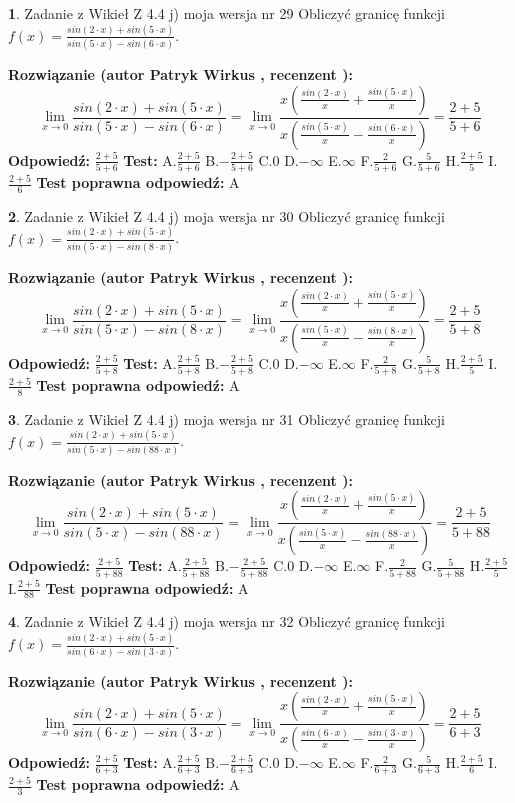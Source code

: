 \documentclass[12pt, a4paper]{article}
\theoremstyle{definition} %
\newtheorem{zad}{}
\newcommand{\zadStart}[1]{\begin{zad}#1\newline}
\newcommand{\zadStop}{\end{zad}}
\newcommand{\rozwStart}[2]{\noindent \textbf{Rozwiązanie (autor #1 , recenzent #2): }\newline}
\newcommand{\rozwStop}{\newline}
\newcommand{\odpStart}{\noindent \textbf{Odpowiedź:}\newline}
\newcommand{\odpStop}{\newline}
\newcommand{\testStart}{\noindent \textbf{Test:}\newline}
\newcommand{\testStop}{\newline}
\newcommand{\kluczStart}{\noindent \textbf{Test poprawna odpowiedź:}\newline}
\newcommand{\kluczStop}{\newline}
\begin{document}
\zadStart{Zadanie z Wikieł Z 4.4 j) moja wersja nr 29}
Obliczyć granicę funkcji $f(x)=\frac{sin(2\cdot x) +sin(5\cdot x)}{sin(5\cdot x) -sin(6\cdot x)}$.
\zadStop
\rozwStart{Patryk Wirkus}{}
$$\lim\limits_{x\to 0}\frac{sin(2\cdot x) +sin(5\cdot x)}{sin(5\cdot x) -sin(6\cdot x)}=\lim\limits_{x\to 0}\frac{x(\frac{sin(2\cdot x)}{x}+\frac{sin(5\cdot x)}{x})}{x(\frac{sin(5\cdot x)}{x}-\frac{sin(6\cdot x)}{x})}=\frac{2+5}{5+6}$$
\rozwStop
\odpStart
$\frac{2+5}{5+6}$
\odpStop
\testStart
A.$\frac{2+5}{5+6}$
B.$-\frac{2+5}{5+6}$
C.$0$
D.$-\infty$
E.$\infty$
F.$\frac{2}{5+6}$
G.$\frac{5}{5+6}$
H.$\frac{2+5}{5}$
I.$\frac{2+5}{6}$
\testStop
\kluczStart
A
\kluczStop



\zadStart{Zadanie z Wikieł Z 4.4 j) moja wersja nr 30}
Obliczyć granicę funkcji $f(x)=\frac{sin(2\cdot x) +sin(5\cdot x)}{sin(5\cdot x) -sin(8\cdot x)}$.
\zadStop
\rozwStart{Patryk Wirkus}{}
$$\lim\limits_{x\to 0}\frac{sin(2\cdot x) +sin(5\cdot x)}{sin(5\cdot x) -sin(8\cdot x)}=\lim\limits_{x\to 0}\frac{x(\frac{sin(2\cdot x)}{x}+\frac{sin(5\cdot x)}{x})}{x(\frac{sin(5\cdot x)}{x}-\frac{sin(8\cdot x)}{x})}=\frac{2+5}{5+8}$$
\rozwStop
\odpStart
$\frac{2+5}{5+8}$
\odpStop
\testStart
A.$\frac{2+5}{5+8}$
B.$-\frac{2+5}{5+8}$
C.$0$
D.$-\infty$
E.$\infty$
F.$\frac{2}{5+8}$
G.$\frac{5}{5+8}$
H.$\frac{2+5}{5}$
I.$\frac{2+5}{8}$
\testStop
\kluczStart
A
\kluczStop



\zadStart{Zadanie z Wikieł Z 4.4 j) moja wersja nr 31}
Obliczyć granicę funkcji $f(x)=\frac{sin(2\cdot x) +sin(5\cdot x)}{sin(5\cdot x) -sin(88\cdot x)}$.
\zadStop
\rozwStart{Patryk Wirkus}{}
$$\lim\limits_{x\to 0}\frac{sin(2\cdot x) +sin(5\cdot x)}{sin(5\cdot x) -sin(88\cdot x)}=\lim\limits_{x\to 0}\frac{x(\frac{sin(2\cdot x)}{x}+\frac{sin(5\cdot x)}{x})}{x(\frac{sin(5\cdot x)}{x}-\frac{sin(88\cdot x)}{x})}=\frac{2+5}{5+88}$$
\rozwStop
\odpStart
$\frac{2+5}{5+88}$
\odpStop
\testStart
A.$\frac{2+5}{5+88}$
B.$-\frac{2+5}{5+88}$
C.$0$
D.$-\infty$
E.$\infty$
F.$\frac{2}{5+88}$
G.$\frac{5}{5+88}$
H.$\frac{2+5}{5}$
I.$\frac{2+5}{88}$
\testStop
\kluczStart
A
\kluczStop



\zadStart{Zadanie z Wikieł Z 4.4 j) moja wersja nr 32}
Obliczyć granicę funkcji $f(x)=\frac{sin(2\cdot x) +sin(5\cdot x)}{sin(6\cdot x) -sin(3\cdot x)}$.
\zadStop
\rozwStart{Patryk Wirkus}{}
$$\lim\limits_{x\to 0}\frac{sin(2\cdot x) +sin(5\cdot x)}{sin(6\cdot x) -sin(3\cdot x)}=\lim\limits_{x\to 0}\frac{x(\frac{sin(2\cdot x)}{x}+\frac{sin(5\cdot x)}{x})}{x(\frac{sin(6\cdot x)}{x}-\frac{sin(3\cdot x)}{x})}=\frac{2+5}{6+3}$$
\rozwStop
\odpStart
$\frac{2+5}{6+3}$
\odpStop
\testStart
A.$\frac{2+5}{6+3}$
B.$-\frac{2+5}{6+3}$
C.$0$
D.$-\infty$
E.$\infty$
F.$\frac{2}{6+3}$
G.$\frac{5}{6+3}$
H.$\frac{2+5}{6}$
I.$\frac{2+5}{3}$
\testStop
\kluczStart
A
\kluczStop
\end{document}

